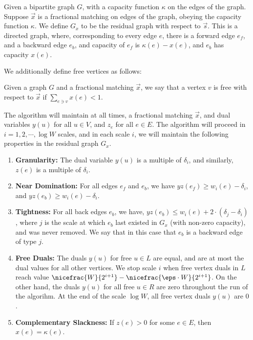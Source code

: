 \begin{definition2}
Given a bipartite graph $G$, with a capacity function $\kappa$ on the edges of the graph. Suppose $\vec{x}$ is a fractional matching on edges of the graph, obeying the capacity function $\kappa$. We define $G_x$ to be the residual graph with respect to $\vec{s}$. This is a directed graph, where, corresponding to every edge $e$, there is a forward edge $e_f$, and a backward edge $e_b$, and capacity of $e_f$ is $\kappa(e)-x(e)$, and $e_b$ has capacity $x(e)$. 
\end{definition2}

 We additionally define free vertices as follows:

\begin{definition2}
Given a graph $G$ and a fractional matching $\vec{x}$, we say that a vertex $v$ is free with respect to $\vec{x}$ if $\sum_{e\ni v}x(e)<1$.
\end{definition2}

\begin{property}\label{prop:invariant} The algorithm will maintain at all times, a fractional matching $\vec{x}$, and dual variables $y(u)$ for all $u\in V$, and $z_e$ for all $e\in E$. The algorithm will proceed in $i=1,2,\cdots, \log W$ scales, and in each scale $i$, we will maintain the following properties in the residual graph $G_x$. 
\begin{enumerate}
\item \textbf{Granularity:} The dual variable $y(u)$ is a multiple of $\delta_i$, and similarly, $z(e)$ is a multiple of $\delta_i$. \label{item:gran}
\item \textbf{Near Domination:} For all edges $e_f$ and $e_b$, we have $yz(e_f)\geqslant w_i(e)-\delta_i$, and $yz(e_b)\geqslant w_i(e)-\delta_i$. \label{item:domin}
\item \textbf{Tightness:} For all back edges $e_b$, we have, $yz(e_b)\leqslant w_i(e)+2\cdot(\delta_j-\delta_i)$, where $j$ is the scale at which $e_b$ last existed in $G_x$ (with non-zero capacity), and was never removed. We say that in this case that $e_b$ is a backward edge of type $j$.  \label{item:tightness}
\item \textbf{Free Duals:} The duals $y(u)$ for free $u\in L$ are equal, and are at most the dual values for all other vertices. We stop scale $i$ when free vertex duals in $L$ reach value $\nicefrac{W}{2^{i+1}}-\nicefrac{\eps\cdot W}{2^{i+1}}$. On the other hand, the duals $y(u)$ for all free $u\in R$ are zero throughout the run of the algorihm. At the end of the scale $\log W$, all free vertex duals $y(u)$ are $0$.\label{item:freeduals}
\item \textbf{Complementary Slackness:} If $z(e)>0$ for some $e\in E$, then $x(e)=\kappa(e)$. \label{item:slackness}
\end{enumerate} 
\end{property}

